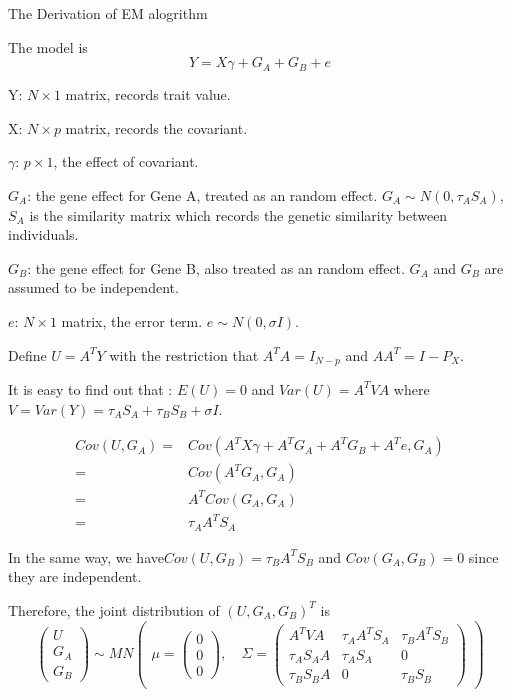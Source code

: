 \documentclass{article}
\begin{document}
    \begin{center}
        \Large{The Derivation of EM alogrithm}
    \end{center}

    \fontsize{11pt}{\baselineskip}\selectfont
    The model is 
    \[
        Y=X\gamma+G_A+G_B+e
    \]
    
    Y: $N\times1$ matrix, records trait value.
    
    X: $N\times p$ matrix, records the covariant.
    
    $\gamma$: $p\times 1$, the effect of covariant.
    
    $G_A$: the gene effect for Gene A, treated as an random effect. $G_A\sim N(0, \tau_AS_A)$, $S_A$ is the similarity matrix which records the genetic similarity between individuals.

    $G_B$: the gene effect for Gene B, also treated as an random effect. $G_A$ and  $G_B$ are assumed to be independent.

    $e$: $N\times1$ matrix,  the error term. $e\sim N (0, \sigma I)$.

    Define $U=A^TY$ with the restriction that $A^TA=I_{N-p}$ and $AA^T=I-P_X$.

    It is easy to find out that : $E(U)=0$ and $Var(U)=A^TVA$ where $V=Var(Y)=\tau_AS_A+\tau_BS_B+\sigma I$.

    \[ \begin{split}
        Cov(U,G_A)=& Cov(A^TX\gamma+A^TG_A+A^TG_B+A^Te,G_A)\\
                  =& Cov(A^TG_A,G_A)\\
                  =& A^TCov(G_A,G_A)\\
                  =&\tau_AA^TS_A
    \end{split}\]

    In the same way, we have$Cov(U,G_B)=\tau_BA^TS_B$ and $Cov(G_A,G_B)=0$ since they are independent.

    Therefore, the joint distribution of $(U,G_A,G_B)^T$ is
    \[
        \begin{pmatrix} U\\G_A\\G_B \end{pmatrix} \sim MN \begin{pmatrix} \mu=\begin{pmatrix} 0\\0\\0 \end{pmatrix},\quad \Sigma=\begin{pmatrix} A^TVA&\tau_AA^TS_A&\tau_BA^TS_B\\ \tau_AS_AA&\tau_AS_A&0\\\tau_BS_BA&0&\tau_BS_B \end{pmatrix} \end{pmatrix}
    \]
    
\end{document}
